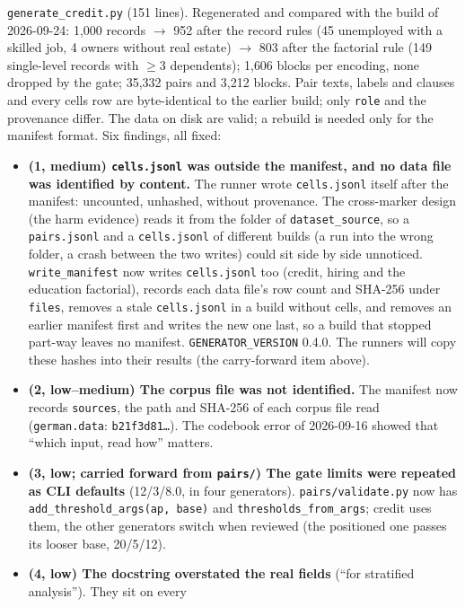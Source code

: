 \documentclass{article}
\begin{document}
\texttt{generate\_credit.py} (151 lines). Regenerated and compared with the build of 2026-09-24: 1{,}000 records
$\to$ 952 after the record rules (45 unemployed with a skilled job, 4 owners without real estate) $\to$ 803
after the factorial rule (149 single-level records with $\geq$3 dependents); 1{,}606 blocks per encoding, none
dropped by the gate; 35{,}332 pairs and 3{,}212 blocks. Pair texts, labels and clauses and every cells row are
byte-identical to the earlier build; only \texttt{role} and the provenance differ. The data on disk are valid;
a rebuild is needed only for the manifest format. Six findings, all fixed:
\begin{itemize}
  \item \textbf{(1, medium) \texttt{cells.jsonl} was outside the manifest, and no data file was identified by
        content.} The runner wrote \texttt{cells.jsonl} itself after the manifest: uncounted, unhashed, without
        provenance. The cross-marker design (the harm evidence) reads it from the folder of
        \texttt{dataset\_source}, so a \texttt{pairs.jsonl} and a \texttt{cells.jsonl} of different builds (a run
        into the wrong folder, a crash between the two writes) could sit side by side unnoticed.
        \texttt{write\_manifest} now writes \texttt{cells.jsonl} too (credit, hiring and the education
        factorial), records each data file's row count and SHA-256 under \texttt{files}, removes a stale
        \texttt{cells.jsonl} in a build without cells, and removes an earlier manifest first and writes the new one
        last, so a build that stopped part-way leaves no manifest. \texttt{GENERATOR\_VERSION} 0.4.0. The runners
        will copy these hashes into their results (the carry-forward item above).
  \item \textbf{(2, low--medium) The corpus file was not identified.} The manifest now records
        \texttt{sources}, the path and SHA-256 of each corpus file read (\texttt{german.data}:
        \texttt{b21f3d81\ldots}). The codebook error of 2026-09-16 showed that ``which input, read how'' matters.
  \item \textbf{(3, low; carried forward from \texttt{pairs/}) The gate limits were repeated as CLI defaults}
        (12/3/8.0, in four generators). \texttt{pairs/validate.py} now has \texttt{add\_threshold\_args(ap, base)}
        and \texttt{thresholds\_from\_args}; credit uses them, the other generators switch when reviewed (the
        positioned one passes its looser base, 20/5/12).
  \item \textbf{(4, low) The docstring overstated the real fields} (``for stratified analysis''). They sit on every

\end{itemize}
\end{document}
